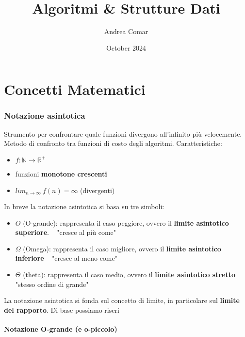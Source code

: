 \documentclass{article}
\title{Algoritmi \& Strutture Dati}
\author{Andrea Comar}
\date{October 2024}
\begin{document}
\maketitle
\newpage
\tableofcontents
\newpage
 
\part{Concetti Matematici}
\section{Notazione asintotica} %
Strumento per confrontare quale funzioni divergono all'infinito più velocemente. Metodo di confronto 
tra funzioni di costo degli algoritmi. Caratteristiche:
\begin{itemize}
    \item $f: \mathbb{N} \rightarrow \mathbb{R^+}$
    \item funzioni \textbf{monotone crescenti}
    \item $lim_{n \rightarrow \infty} \ f(n) = \infty$ (divergenti)
\end{itemize}

In breve la notazione asintotica si basa su tre simboli:
\begin{itemize}
    \item $O$ (O-grande): rappresenta il caso peggiore, ovvero il \textbf{limite asintotico superiore}. ~ "cresce al più come"
    \item $\Omega$ (Omega): rappresenta il caso migliore, ovvero il \textbf{limite asintotico inferiore} ~ "cresce al meno come"
    \item $\Theta$ (theta): rappresenta il caso medio, ovvero il \textbf{limite asintotico stretto} ~ "stesso ordine di grande"
\end{itemize}
La notazione asintotica si fonda sul concetto di limite, in particolare sul \textbf{limite del rapporto}. Di base possiamo riscri


\subsection{Notazione O-grande (e o-piccolo)} %
\end{document}
